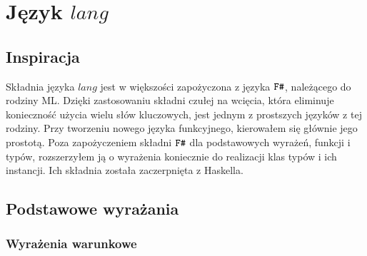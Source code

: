 \documentclass[declaration,shortabstract]{iithesis}
\begin{document}


\chapter{Język $lang$}

\section{Inspiracja}
Składnia języka $lang$ jest w większości zapożyczona z języka $\verb!F#!$, należącego
do rodziny ML. Dzięki zastosowaniu składni czułej na wcięcia, która eliminuje 
konieczność użycia wielu słów kluczowych, jest jednym z  prostszych języków z 
tej rodziny. Przy tworzeniu nowego języka funkcyjnego, kierowałem się głównie 
jego prostotą. Poza zapożyczeniem składni $\verb!F#!$ dla podstawowych wyrażeń,
funkcji i typów, rozszerzyłem ją o wyrażenia koniecznie do realizacji klas 
typów i ich instancji. Ich składnia została zaczerpnięta z Haskella.

\section{Podstawowe wyrażania}

\subsection{Wyrażenia warunkowe}
\end{document}
